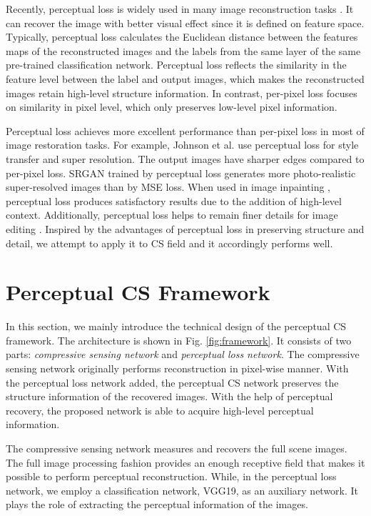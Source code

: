 \documentclass[runningheads]{llncs}
\begin{document}
Recently, perceptual loss \cite{Johnson2016Perceptual} is widely used in many image reconstruction tasks \cite{Johnson2016Perceptual} \cite{Isola_2017_CVPR} \cite{Yeh2017Semantic} \cite{Ledig_2017_CVPR} \cite{Shen_2017_CVPR} \cite{Huang2017Beyond}.
It can recover the image with better visual effect since it is defined on feature space. Typically, perceptual loss calculates the Euclidean distance between the features maps of the reconstructed images and the labels from the same layer of the same pre-trained classification network.
Perceptual loss reflects the similarity in the feature level between the label and output images, which makes the reconstructed images retain high-level structure information. In contrast, per-pixel loss focuses on similarity in pixel level, which only preserves low-level pixel information.

Perceptual loss achieves more excellent performance than per-pixel loss in most of image restoration tasks. For example, Johnson et al. \cite{Johnson2016Perceptual} use perceptual loss for style transfer and super resolution. The output images have sharper edges compared to per-pixel loss. SRGAN \cite{Ledig_2017_CVPR} trained by perceptual loss generates more photo-realistic super-resolved images than by MSE loss. When used in image inpainting \cite{Shen_2017_CVPR}, perceptual loss produces satisfactory results due to the addition of high-level context. Additionally, perceptual loss helps to remain finer details for image editing \cite{Yeh2017Semantic}. Inspired by the advantages of perceptual loss in preserving structure and detail, we attempt to apply it to CS field and it accordingly performs well.

\section{Perceptual CS Framework}

In this section, we mainly introduce the technical design of the perceptual CS framework. The architecture is shown in Fig. \ref{fig:framework}. It consists of two parts: \emph{compressive sensing network} and \emph{perceptual loss network}.
The compressive sensing network originally performs reconstruction in pixel-wise manner. %
With the perceptual loss network added, the perceptual CS network preserves the structure information of the recovered images.
With the help of perceptual recovery, the proposed network is able to acquire high-level perceptual information.

The compressive sensing network measures and recovers the full scene images.
The full image processing fashion provides an enough receptive field that makes it possible to perform perceptual reconstruction.
While, in the perceptual loss network, we employ a classification network, VGG19, as an auxiliary network. It plays the role of extracting the perceptual information of the images.
\end{document}
